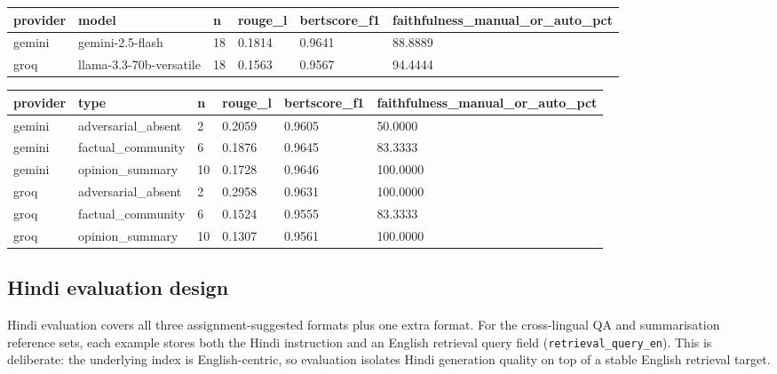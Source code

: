 \documentclass[11pt]{article}
\begin{document}
        \begin{center}
\small\begin{tabular}{p{}|p{}|p{}|p{}|p{}|p{}}
\hline
provider & model & n & rouge\_l & bertscore\_f1 & faithfulness\_manual\_or\_auto\_pct \\ \hline
gemini & gemini-2.5-flash & 18 & 0.1814 & 0.9641 & 88.8889 \\ \hline
groq & llama-3.3-70b-versatile & 18 & 0.1563 & 0.9567 & 94.4444 \\ \hline
\end{tabular}
\end{center}

        \begin{center}
\small\begin{tabular}{p{}|p{}|p{}|p{}|p{}|p{}}
\hline
provider & type & n & rouge\_l & bertscore\_f1 & faithfulness\_manual\_or\_auto\_pct \\ \hline
gemini & adversarial\_absent & 2 & 0.2059 & 0.9605 & 50.0000 \\ \hline
gemini & factual\_community & 6 & 0.1876 & 0.9645 & 83.3333 \\ \hline
gemini & opinion\_summary & 10 & 0.1728 & 0.9646 & 100.0000 \\ \hline
groq & adversarial\_absent & 2 & 0.2958 & 0.9631 & 100.0000 \\ \hline
groq & factual\_community & 6 & 0.1524 & 0.9555 & 83.3333 \\ \hline
groq & opinion\_summary & 10 & 0.1307 & 0.9561 & 100.0000 \\ \hline
\end{tabular}
\end{center}

        \subsection*{Hindi evaluation design}
        Hindi evaluation covers all three assignment-suggested formats plus one extra format. For the cross-lingual QA and summarisation reference sets, each example stores both the Hindi instruction and an English retrieval query field (\texttt{retrieval\_query\_en}). This is deliberate: the underlying index is English-centric, so evaluation isolates Hindi generation quality on top of a stable English retrieval target.
\end{document}
